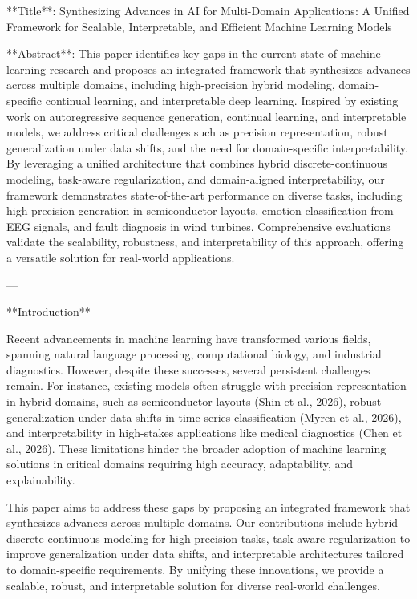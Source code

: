 **Title**: Synthesizing Advances in AI for Multi-Domain Applications: A Unified Framework for Scalable, Interpretable, and Efficient Machine Learning Models

**Abstract**: This paper identifies key gaps in the current state of machine learning research and proposes an integrated framework that synthesizes advances across multiple domains, including high-precision hybrid modeling, domain-specific continual learning, and interpretable deep learning. Inspired by existing work on autoregressive sequence generation, continual learning, and interpretable models, we address critical challenges such as precision representation, robust generalization under data shifts, and the need for domain-specific interpretability. By leveraging a unified architecture that combines hybrid discrete-continuous modeling, task-aware regularization, and domain-aligned interpretability, our framework demonstrates state-of-the-art performance on diverse tasks, including high-precision generation in semiconductor layouts, emotion classification from EEG signals, and fault diagnosis in wind turbines. Comprehensive evaluations validate the scalability, robustness, and interpretability of this approach, offering a versatile solution for real-world applications.

---

**Introduction**

Recent advancements in machine learning have transformed various fields, spanning natural language processing, computational biology, and industrial diagnostics. However, despite these successes, several persistent challenges remain. For instance, existing models often struggle with precision representation in hybrid domains, such as semiconductor layouts (Shin et al., 2026), robust generalization under data shifts in time-series classification (Myren et al., 2026), and interpretability in high-stakes applications like medical diagnostics (Chen et al., 2026). These limitations hinder the broader adoption of machine learning solutions in critical domains requiring high accuracy, adaptability, and explainability.

This paper aims to address these gaps by proposing an integrated framework that synthesizes advances across multiple domains. Our contributions include hybrid discrete-continuous modeling for high-precision tasks, task-aware regularization to improve generalization under data shifts, and interpretable architectures tailored to domain-specific requirements. By unifying these innovations, we provide a scalable, robust, and interpretable solution for diverse real-world challenges.

